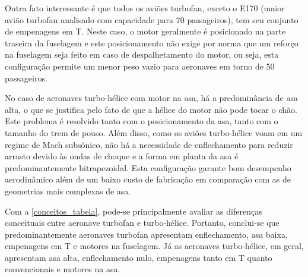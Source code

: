 Outra fato interessante é que todos os aviões turbofan, exceto o E170 (maior avião turbofan analisado com capacidade para 70 passageiros), tem seu conjunto de empenagens em T. Neste caso, o motor geralmente é posicionado na parte traseira da fuselagem e este posicionamento não exige por norma que um reforço na fuselagem seja feito em caso de despalhetamento do motor, ou seja, esta configuração permite um menor peso vazio para aeronaves em torno de 50 passageiros.

No caso de aeronaves turbo-hélice com motor na asa, há a predominância de asa alta, o que se justifica pelo fato de que a hélice do motor não pode tocar o chão. Este problema é resolvido tanto com o posicionamento da asa, tanto com o tamanho do trem de pouso. Além disso, como os aviões turbo-hélice voam em um regime de Mach subsônico, não há a necessidade de enflechamento para reduzir arrasto devido às ondas de choque e a forma em planta da asa é predominantemente bitrapezoidal. Esta configuração garante bom desempenho aerodinâmico além de um baixo custo de fabricação em comparação com as de geometrias mais complexas de asa.

Com a \autoref{conceitos_tabela}, pode-se principalmente avaliar as diferenças conceituais entre aeronave turbofan e turbo-hélice. Portanto, conclui-se que predominantemente aeronaves turbofan apresentam enflechamento, asa baixa, empenagens em T e motores na fuselagem. Já as aeronaves turbo-hélice, em geral, apresentam asa alta, enflechamento nulo, empenagens tanto em T quanto convencionais e motores na asa.
